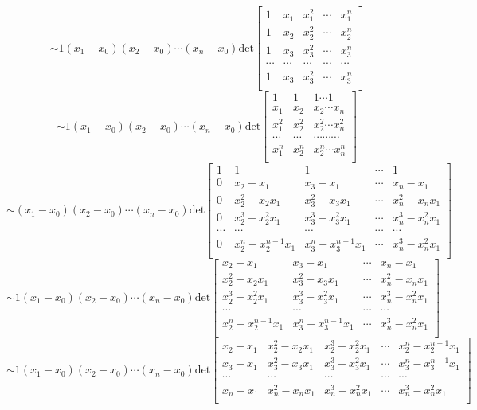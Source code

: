 \documentclass[letterpaper,12pt]{article}
\theoremstyle{definition}
\begin{document}
\[
\sim
1(x_1-x_0)(x_2-x_0)\cdots(x_n - x_0)\text{det}
\begin{bmatrix}
    1 & x_1 & x_1^2 & \cdots & x_1^n \\
    1 & x_2 & x_2^2 & \cdots & x_2^n \\
    1 & x_3 & x_3^2 & \cdots & x_3^n \\
    \cdots &\cdots &\cdots &\cdots &\cdots \\
    1 & x_3 & x_3^2 & \cdots & x_3^n \\
\end{bmatrix}
\]
\[
\sim
1(x_1-x_0)(x_2-x_0)\cdots(x_n - x_0)\text{det}
\begin{bmatrix}
    1 & 1 & 1 \cdots 1 \\ 
    x_1 & x_2 & x_2 \cdots x_n \\ 
    x_1^2 & x_2^2 & x_2^2 \cdots x_n^2 \\ 
    \cdots & \cdots & \cdots \cdots \cdots \\ 
    x_1^n & x_2^n & x_2^n \cdots x_n^n \\ 
\end{bmatrix} 
\]
\[
\sim
(x_1-x_0)(x_2-x_0)\cdots(x_n - x_0)\text{det}
\begin{bmatrix}
    1 & 1 & 1 &\cdots& 1 \\ 
    0 & x_2 - x_1 & x_3 - x_1 &\cdots& x_n - x_1 \\ 
    0 & x_2^2 - x_2x_1 & x_3^2 - x_3x_1 &\cdots &x_n^2 - x_nx_1  \\ 
    0 & x_2^3 - x_2^2x_1 & x_3^3 - x_3^2x_1 &\cdots &x_n^3 - x_n^2x_1  \\ 
    \cdots & \cdots & \cdots& \cdots &\cdots \\ 
    0 & x_2^n - x_2^{n-1}x_1 & x_3^n - x_3^{n-1}x_1&\cdots& x_n^3 - x_n^2x_1  \\ 
\end{bmatrix} 
\]
\[
\sim
1(x_1-x_0)(x_2-x_0)\cdots(x_n - x_0)\text{det}
\begin{bmatrix}
x_2 - x_1 & x_3 - x_1 &\cdots& x_n - x_1 \\ 
x_2^2 - x_2x_1 & x_3^2 - x_3x_1 &\cdots &x_n^2 - x_nx_1  \\ 
x_2^3 - x_2^2x_1 & x_3^3 - x_3^2x_1 &\cdots &x_n^3 - x_n^2x_1  \\ 
\cdots & \cdots& \cdots &\cdots \\ 
x_2^n - x_2^{n-1}x_1 & x_3^n - x_3^{n-1}x_1&\cdots& x_n^3 - x_n^2x_1  \\ 
\end{bmatrix} 
\]
\[
\sim
1(x_1-x_0)(x_2-x_0)\cdots(x_n - x_0)\text{det}
\begin{bmatrix}
    x_2 - x_1 & x_2^2 - x_2x_1 &x_2^3 - x_2^2x_1 &\cdots &x_2^n - x_2^{n-1}x_1\\
    x_3 - x_1 &x_3^2 - x_3x_1 &x_3^3 - x_3^2x_1 &\cdots & x_3^n - x_3^{n-1}x_1\\
    \cdots&\cdots&\cdots &\cdots &\cdots\\
    x_n - x_1 &x_n^2 - x_nx_1& x_n^3 - x_n^2x_1 &\cdots & x_n^3 - x_n^2x_1 \\ 
\end{bmatrix}
\]
\end{document}
